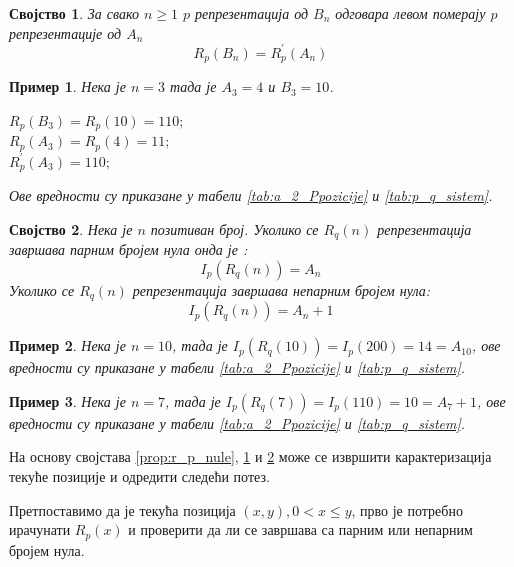 \documentclass[a4paper]{article}
\newtheorem{example}{Пример}
\newtheorem{property}{Својство}
\begin{document}
\begin{property}
	\label{prop:levi_pomeraj}
	За свако $ n \geq 1 $ $ p $ репрезентација од $ B_{n} $ одговара левом померају $ p $ репрезентације од  $ A_{n} $
		\begin{displaymath}
			R_{p} (B_{n}) = R_{p}^{'} (A_{n}) 
		\end{displaymath}
\end{property}

\begin{example}
	Нека је $ n = 3 $ тада је $ A_{3} = 4 $ и $ B_{3} = 10 $.
	\begin{center}
		$ R_{p}(B_{3}) = R_{p}(10) = 110; $ \\
		$ R_{p}(A_{3}) = R_{p}(4) = 11; $ \\
		$ R_{p}^{'}(A_{3}) = 110; $ 
	\end{center}
	Ове вредности су приказане у табели \ref{tab:a_2_Ppozicije} и \ref{tab:p_q_sistem}.
\end{example}

\begin{property}
	\label{prop:r_q_nule}
	Нека је $ n $ позитиван број. Уколико се $ R_q(n) $ репрезентација завршава парним бројем нула онда је :
	\begin{displaymath}
		I_{p}(R_q(n)) = A_{n}
	\end{displaymath}
	Уколико се $ R_q(n) $ репрезентација завршава непарним бројем нула: 
	\begin{displaymath}
		I_{p}(R_q(n)) = A_{n} + 1
	\end{displaymath}
\end{property}

\begin{example}
	Нека је $ n = 10 $, тада је $ I_{p}(R_q(10)) = I_{p}(200) = 14 = A_{10} $, ове вредности су приказане у табели \ref{tab:a_2_Ppozicije} и \ref{tab:p_q_sistem}.
\end{example}

\begin{example}
	Нека је $ n = 7 $, тада је $ I_{p}(R_q(7)) = I_{p}(110) = 10 = A_{7} + 1 $, ове вредности су приказане у табели \ref{tab:a_2_Ppozicije} и \ref{tab:p_q_sistem}.
\end{example}

На основу својстава \ref{prop:r_p_nule}, \ref{prop:levi_pomeraj} и \ref{prop:r_q_nule} може се извршити карактеризација текуће позиције и одредити следећи потез.

Претпоставимо да је текућа позиција $ (x, y), 0 < x \le y $, прво је потребно ирачунати $ R_{p}(x) $ и проверити да ли се завршава са парним или непарним бројем нула.
\end{document}
